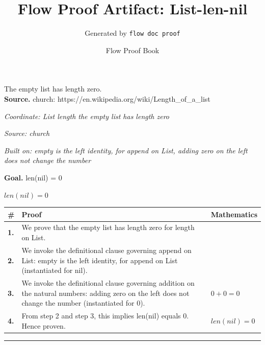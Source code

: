 \documentclass[11pt]{article}
\title{Flow Proof Artifact: List-len-nil}
\author{Generated by \texttt{flow doc proof}}
\date{Flow Proof Book}
\theoremstyle{definition}
\begin{document}
\maketitle
The empty list has length zero.\\[0.5em]
\textbf{Source.} church: https://en.wikipedia.org/wiki/Length\_of\_a\_list\\[0.5em]
\bigskip
{}\par
\smallskip\noindent\textit{Coordinate: List \cdot length \cdot the empty list has length zero}\par
\smallskip\noindent\textit{Source: church}\par
\smallskip\noindent\textit{Built on: empty is the left identity, for append on List, adding zero on the left does not change the number}\par
\medskip
\noindent\textbf{Goal.} len(nil) = 0\par
\noindent$\displaystyle len(nil) = 0$\par
\medskip
\noindent
\begin{tabular}{@{} >{\raggedright\arraybackslash}p{} >{\raggedright\arraybackslash}p{} >{\raggedleft\arraybackslash}p{} @{}}
\textbf{\#} & \textbf{Proof} & \textbf{Mathematics} \\
\midrule
\textbf{1.} & We prove that the empty list has length zero for length on List. & \\[0.45em]
\textbf{2.} & We invoke the definitional clause governing append on List: empty is the left identity, for append on List (instantiated for nil). & \\[0.45em]
\textbf{3.} & We invoke the definitional clause governing addition on the natural numbers: adding zero on the left does not change the number (instantiated for 0). & $\displaystyle 0 + 0 = 0$ \\[0.45em]
\textbf{4.} & From step 2 and step 3, this implies len(nil) equals 0. Hence proven. & $\displaystyle len(nil) = 0$ \\[0.45em]
\bottomrule
\end{tabular}
\label{thm:List-length-the_empty_list_has_length_zero}
\par\medskip\hrule
\end{document}
